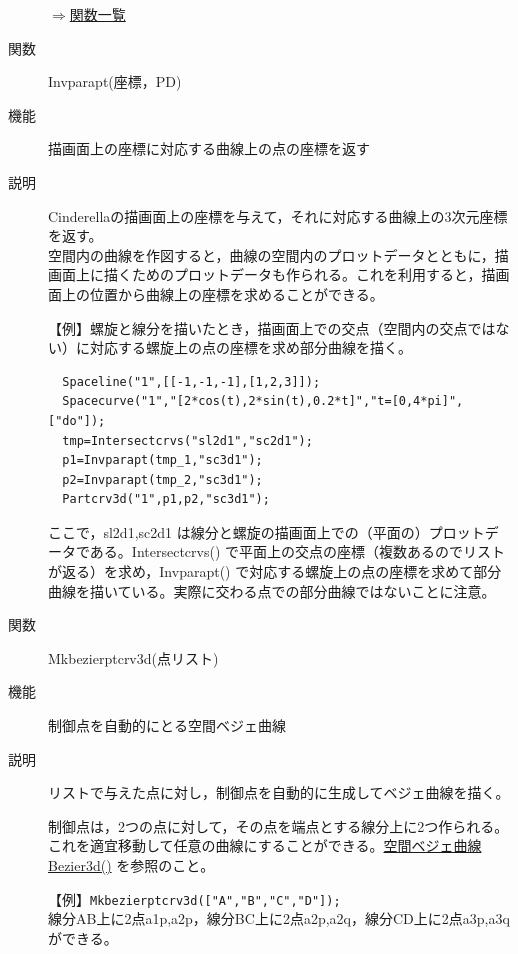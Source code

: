 \documentclass[papersize,a4paper,12pt,uplatex]{jsarticle}
\begin{document}
\begin{description}
\begin{flushright} \hyperlink{functionlist}{$\Rightarrow$関数一覧}\end{flushright}

\hypertarget{invparapt}{}
\item[関数]  Invparapt(座標，PD)
\item[機能]  描画面上の座標に対応する曲線上の点の座標を返す
\item[説明]  Cinderellaの描画面上の座標を与えて，それに対応する曲線上の3次元座標を返す。
\\
空間内の曲線を作図すると，曲線の空間内のプロットデータとともに，描画面上に描くためのプロットデータも作られる。これを利用すると，描画面上の位置から曲線上の座標を求めることができる。

\vspace{\baselineskip}
【例】螺旋と線分を描いたとき，描画面上での交点（空間内の交点ではない）に対応する螺旋上の点の座標を求め部分曲線を描く。

\begin{verbatim}
  Spaceline("1",[[-1,-1,-1],[1,2,3]]);
  Spacecurve("1","[2*cos(t),2*sin(t),0.2*t]","t=[0,4*pi]",["do"]);
  tmp=Intersectcrvs("sl2d1","sc2d1");
  p1=Invparapt(tmp_1,"sc3d1");
  p2=Invparapt(tmp_2,"sc3d1");
  Partcrv3d("1",p1,p2,"sc3d1"); 
\end{verbatim}
 \begin{center}\scalebox{0.8}{ } \end{center}
 
ここで，sl2d1,sc2d1 は線分と螺旋の描画面上での（平面の）プロットデータである。Intersectcrvs() で平面上の交点の座標（複数あるのでリストが返る）を求め，Invparapt() で対応する螺旋上の点の座標を求めて部分曲線を描いている。実際に交わる点での部分曲線ではないことに注意。

\vspace{\baselineskip}
\hypertarget{mkbezierptcrv3d}{}
\item[関数]  Mkbezierptcrv3d(点リスト)
\item[機能]  制御点を自動的にとる空間ベジェ曲線
\item[説明]  リストで与えた点に対し，制御点を自動的に生成してベジェ曲線を描く。

  制御点は，2つの点に対して，その点を端点とする線分上に2つ作られる。これを適宜移動して任意の曲線にすることができる。\hyperlink{bezier3d}{空間ベジェ曲線 Bezier3d()} を参照のこと。
  
\vspace{\baselineskip}
【例】\verb|Mkbezierptcrv3d(["A","B","C","D"]);|\\
    線分AB上に2点a1p,a2p，線分BC上に2点a2p,a2q，線分CD上に2点a3p,a3qができる。
    


\end{description}
\end{document}
